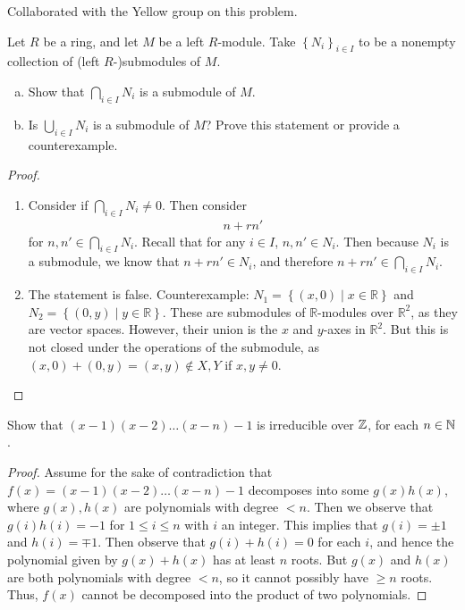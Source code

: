 \documentclass[num=2,duedate=02-10-21,course=Algebra\ II,proflastname=Walton]{hwtemplate}
\begin{document}
\problem[3]
Collaborated with the Yellow group on this problem.
\begin{claim}
	Let \(R\) be a ring, and let \(M\) be a left \(R\)-module. Take \(\left\{ N_i \right\}_{i \in I}\) to be a nonempty collection of (left \(R\)-)submodules of \(M\).
	\begin{enumerate}[(a).]
		\item Show that \(\bigcap_{i \in  I}N_i\) is a submodule of \(M\).
		\item Is \(\bigcup_{i \in  I}N_i\) is a submodule of \(M\)? Prove this statement or provide a counterexample.
	\end{enumerate}
\end{claim}
\begin{proof}
\begin{enumerate}
    \item Consider if \(\bigcap_{i \in I}N_i \neq 0\). Then consider
    \begin{align}
        n + rn'
    \end{align}
    for \(n, n' \in \bigcap_{i \in I}N_i \). Recall that for any \(i \in I\), \(n, n' \in N_i\). Then because \(N_i\) is a submodule, we know that \(n+rn' \in N_i\), and therefore \(n +rn' \in \bigcap_{i \in I} N_i\).
    \item The statement is false. Counterexample: $N_1 = \left\{ (x,0) \mid x \in \mathbb{R}\right\}$ and \(N_2 = \left\{ (0,y) \mid y \in \mathbb{R}\right\}\). These are submodules of \(\mathbb{R}\)-modules over \(\mathbb{R}^2\), as they are vector spaces. However, their union is the $x$ and $y$-axes in \(\mathbb{R}^2\). But this is not closed under the operations of the submodule, as \((x,0)+(0,y) = (x,y) \notin X,Y\) if \(x,y\neq 0\).
\end{enumerate}

\end{proof}

\separator
\problem[4]
\begin{claim}
	Show that \((x-1)(x-2)\ldots(x-n)-1\) is irreducible over \(\mathbb{Z}\), for each \(n \in \mathbb{N}\).
\end{claim}
\begin{proof}
	Assume for the sake of contradiction that \(f(x) = (x-1)(x-2)\ldots(x-n)-1\) decomposes into some \(g(x)h(x)\), where \(g(x),h(x)\) are polynomials with degree \(<n\). Then we observe that \(g(i)h(i) = -1\) for \(1\leq i\leq n\) with \(i\) an integer. This implies that \(g(i) = \pm 1\)  and \(h(i) = \mp 1\). Then observe that \(g(i)+h(i) = 0\) for each \(i\), and hence the polynomial given by \(g(x)+h(x)\) has at least \(n\) roots. But \(g(x)\) and \(h(x)\) are both polynomials with degree \(<n\), so it cannot possibly have \(\geq n\) roots. Thus, \(f(x)\) cannot be decomposed into the product of two polynomials.
\end{proof}
\end{document}

